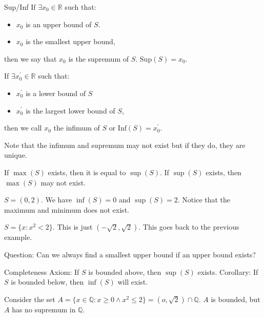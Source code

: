 \documentclass{report}
\begin{document}
\begin{definition}{Sup/Inf}
    If $\exists x_{0} \in \mathbb{R}$ such that:
        \begin{itemize}
            \item $x_{0}$ is an upper bound of $S$.

            \item $x_{0}$ is the smallest upper bound,
        \end{itemize}
    then we say that $x_{0}$ is the supremum of $S$. $\text{Sup}(S) = x_{0}$.

    If $\exists x_{0}^{\prime} \in \mathbb{R}$ such that:
        \begin{itemize}
            \item $x_{0}^{\prime}$ is a lower bound of $S$

            \item $x_{0}^{\prime}$ is the largest lower bound of $S$,
        \end{itemize}
    then we call $x_{0}$ the infimum of $S$ or $\text{Inf}(S) = x_{0}^{\prime}$.

    Note that the infimum and supremum may not exist but if they do, they are unique.
\end{definition}

If $\max(S)$ exists, then it is equal to $\sup (S)$. If $\sup (S)$ exists, then $\max(S)$ may not exist.

\begin{examples}
    \begin{example}
        $S = (0, 2)$. We have $\inf (S) = 0$ and $\sup (S) = 2$. Notice that the maximum and minimum does not exist.
    \end{example}

    \begin{example}
        $S = \{x : x^{2} <  2\}$. This is just $(-\sqrt{2}, \sqrt{2})$. This goes back to the previous example.
    \end{example}
\end{examples}

Question: Can we always find a smallest upper bound if an upper bound exists?

Completeness Axiom: If $S$ is bounded above, then $\sup (S)$ exists. Corollary: If $S$ is bounded below, then $\inf (S)$ will exist. 

\begin{examples}
    \begin{example}
        Consider the set $A = \{x \in \mathbb{Q}: x \geq 0 \land x^{2} \leq  2\} = (o, \sqrt{2}) \cap \mathbb{Q}$. $A$ is bounded, but $A$ has no supremum in $\mathbb{Q}$.
    \end{example}
\end{examples}
\end{document}
